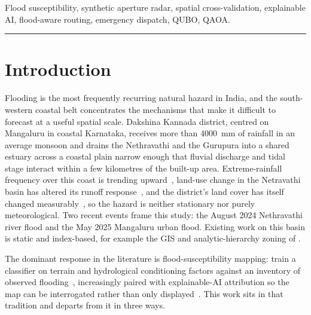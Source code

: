 \documentclass[journal]{IEEEtran}
\begin{document}
\begin{IEEEkeywords}
Flood susceptibility, synthetic aperture radar, spatial cross-validation, explainable AI, flood-aware routing, emergency dispatch, QUBO, QAOA.
\end{IEEEkeywords}




\vspace{4pt}
\hrule
\vspace{10pt}

\section{Introduction}
\label{sec:intro}

Flooding is the most frequently recurring natural hazard in India, and the
south-western coastal belt concentrates the mechanisms that make it difficult to
forecast at a useful spatial scale. Dakshina Kannada district, centred on
Mangaluru in coastal Karnataka, receives more than \SI{4000}{\milli\metre} of
rainfall in an average monsoon and drains the Nethravathi and the Gurupura into a
shared estuary across a coastal plain narrow enough that fluvial discharge and
tidal stage interact within a few kilometres of the built-up area.
Extreme-rainfall frequency over this coast is trending
upward~\citep{chandrashekar2018}, land-use change in the Netravathi basin has
altered its runoff response~\citep{chandana2023,babar2015}, and the district's
land cover has itself changed measurably~\citep{naik2022}, so the hazard is
neither stationary nor purely meteorological. Two recent events frame this study:
the August 2024 Nethravathi river flood and the May 2025 Mangaluru urban flood.
Existing work on this basin is static and index-based, for example the GIS and
analytic-hierarchy zoning of \citet{nirmala2026}.

The dominant response in the literature is flood-susceptibility mapping: train a
classifier on terrain and hydrological conditioning factors against an inventory
of observed flooding~\citep{tehrany2014,khosravi2018,arabameri2019,saha2021},
increasingly paired with explainable-AI attribution so the map can be
interrogated rather than only
displayed~\citep{lundberg2017,aydin2022,seydi2023}. This work sits in that
tradition and departs from it in three ways.
\end{document}
